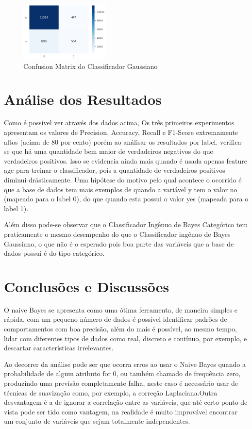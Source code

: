 \documentclass[conference]{IEEEtran}
\begin{document}
\begin{figure}[H]
    \centerline{\includegraphics[width=0.4\textwidth]{IMGS/cm-gnb-numeric.png}}
    \caption{\label{fig:cm3-gnb}Confusion Matrix do Classificador Gaussiano}
\end{figure}


\section{Análise dos Resultados}

Como é possível ver através dos dados acima, Os três primeiros experimentos apresentam os valores de Precision, Accuracy, Recall e F1-Score
extremamente altos (acima de 80 por cento) porém ao análisar os resultados por label. verifica-se que há uma quantidade bem maior de verdadeiros negativos do que verdadeiros positivos.
Isso se evidencia ainda mais quando é usada apenas feature age para treinar o classificador, pois a quantidade de verdadeiros positivos diminui drásticamente.
Uma hipótese do motivo pelo qual acontece o ocorrido é que a base de dados tem mais exemplos de quando a variável y tem o valor no (mapeado para o label 0),
do que quando esta possui o valor yes (mapeada para o label 1).

Além disso pode-se observar que o Classificador Ingênuo de Bayes Categórico tem praticamente o mesmo desempenho do que o Classificador ingênuo de Bayes Gaussiano, o que não é o esperado pois boa parte das variáveis que a base de dados possui é do tipo categórico.


\section{Conclusões e Discussões}
O naive Bayes se apresenta como uma ótima ferramenta, de maneira simples e rápida, com um pequeno número de dados é possível identificar padrões de comportamentos com boa precisão, além do mais é possível, ao mesmo tempo, lidar com diferentes tipos de dados como real, discreto e contínuo, por exemplo, e descartar características irrelevantes.


Ao decorrer da análise pode ser que ocorra erros ao usar o Naive Bayes quando a probabilidade de algum atributo for 0, ou também chamado de frequência zero, produzindo uma previsão completamente falha, neste caso é necessário usar de técnicas de suavização como, por exemplo, a correção Laplaciana.Outra desvantagem é a de ignorar a correlação entre as variáveis, que até certo ponto de vista pode ser tido como vantagem, na realidade é muito improvável encontrar um conjunto de variáveis que sejam totalmente independentes.





\nocite{*}

\end{document}
